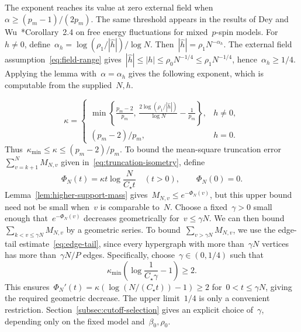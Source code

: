 \documentclass[letterpaper,11pt,reqno]{amsart}
\renewcommand{\leq}{\leqslant}
\renewcommand{\geq}{\geqslant}
\newcommand{\hh}{\hat{h}}
\begin{document}
The exponent reaches its value at zero external field when~$\alpha\geq(p_m-1)/(2p_m)$. The same threshold appears in the results of Dey and Wu~\cite{DW26}*{Corollary~2.4} on free energy fluctuations for mixed~$p$-spin models. For~$h\ne0$, define~$\alpha_h=\log(\rho_1/|\hh|)/\log N$. Then~$|\hh|=\rho_1N^{-\alpha_h}$. The external field assumption~\eqref{eq:field-range} gives~$|\hh|\leq|h|\leq\rho_0N^{-1/4}\leq\rho_1N^{-1/4}$, hence~$\alpha_h\geq1/4$. Applying the lemma with~$\alpha=\alpha_h$ gives the following exponent, which is computable from the supplied~$N,h$.

\begin{equation}\label{eq:field-dependent-kappa}
\kappa=\begin{cases}
\displaystyle\min\left\{\frac{p_m-2}{p_m},\,
\frac{2\log(\rho_1/|\hh|)}{\log N}-\frac1{p_m}\right\},&h\ne0,\\[6pt]
(p_m-2)/p_m,&h=0.
\end{cases}
\end{equation}
Thus~$\kappa_{\min}\leq\kappa\leq(p_m-2)/p_m$. To bound the mean-square truncation error~$\sum_{v=k+1}^{N}M_{N,v}$ given in~\eqref{eq:truncation-isometry}, define
\begin{equation*}
\Phi_N(t)=\kappa t\log\frac{N}{C_\star t}\quad(t>0),
\qquad \Phi_N(0)=0.
\end{equation*}
Lemma~\ref{lem:higher-support-mass} gives~$M_{N,v}\leq e^{-\Phi_N(v)}$, but this upper bound need not be small when~$v$ is comparable to~$N$. Choose a fixed~$\gamma>0$ small enough that~$e^{-\Phi_N(v)}$ decreases geometrically for~$v\leq\gamma N$. We can then bound~$\sum_{k<v\leq\gamma N}M_{N,v}$ by a geometric series. To bound~$\sum_{v>\gamma N}M_{N,v}$, we use the edge-tail estimate~\eqref{eq:edge-tail}, since every hypergraph with more than~$\gamma N$ vertices has more than~$\gamma N/P$ edges. Specifically, choose~$\gamma\in(0,1/4)$ such that
\begin{equation*}
\kappa_{\min}\left(\log\frac{1}{C_\star\gamma}-1\right)\geq2.
\end{equation*}
This ensures~$\Phi_N'(t)=\kappa(\log(N/(C_\star t))-1)\geq2$ for~$0<t\leq\gamma N$, giving the required geometric decrease. The upper limit~$1/4$ is only a convenient restriction. Section~\ref{subsec:cutoff-selection} gives an explicit choice of~$\gamma$, depending only on the fixed model and~$\beta_0,\rho_0$.
\end{document}
